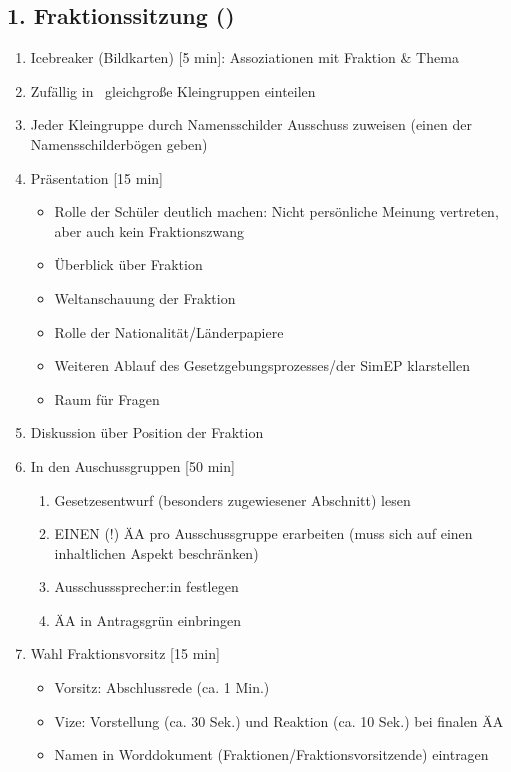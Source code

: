 \documentclass{article}
\begin{document}
	\subsection{1. Fraktionssitzung (\timeFrakOne)}
	\begin{enumerate}
		\item Icebreaker (Bildkarten) [5 min]: \newline Assoziationen mit Fraktion \& Thema
        \item Zufällig in \anzahlcomm\ gleichgroße Kleingruppen einteilen
        \item Jeder Kleingruppe durch Namensschilder Ausschuss zuweisen (einen der Namensschilderbögen geben)
		\item Präsentation [15 min]
		\begin{itemize}
			\item Rolle der Schüler deutlich machen: \newline
            Nicht persönliche Meinung vertreten, aber auch kein Fraktionszwang
			\item Überblick über Fraktion
			\item Weltanschauung der Fraktion
			\item Rolle der Nationalität/Länderpapiere
			\item Weiteren Ablauf des Gesetzgebungsprozesses/der SimEP klarstellen
            \item Raum für Fragen
		\end{itemize}
		\item Diskussion über Position der Fraktion \THEMA \newline [10 min]
		\item In den Auschussgruppen [50 min]
		\begin{enumerate}
			\item Gesetzesentwurf (besonders zugewiesener Abschnitt) lesen
			\item EINEN (!) ÄA pro Ausschussgruppe erarbeiten \newline (muss sich auf einen inhaltlichen Aspekt beschränken)
	        \item Ausschusssprecher:in festlegen		
            \item ÄA in Antragsgrün einbringen
		\end{enumerate} 
		\item Wahl Fraktionsvorsitz [15 min]
		\begin{itemize}
			\item Vorsitz: Abschlussrede (ca. 1 Min.)
			\item Vize: Vorstellung (ca. 30 Sek.) und Reaktion (ca. 10 Sek.) \newline bei finalen ÄA 
			\item Namen in Worddokument (Fraktionen/Fraktionsvorsitzende) \newline eintragen
		\end{itemize}
	\end{enumerate}
	
\end{document}
